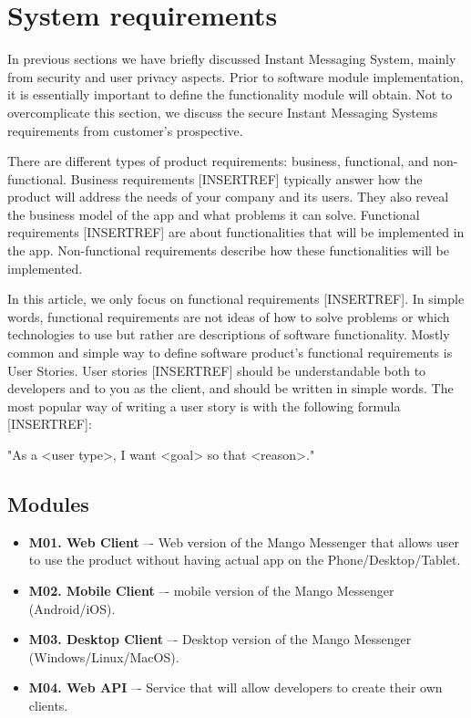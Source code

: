 \chapter{System requirements}\label{ch:system-requirements}

In previous sections we have briefly discussed Instant Messaging System, mainly from security and user privacy aspects.
Prior to software module implementation, it is essentially important to define the functionality module will obtain.
Not to overcomplicate this section, we discuss the secure Instant Messaging Systems requirements from customer's prospective.

There are different types of product requirements: business, functional, and non-functional.
Business requirements [INSERTREF] typically answer how the product will address the needs of your company and its users.
They also reveal the business model of the app and what problems it can solve.
Functional requirements [INSERTREF] are about functionalities that will be implemented in the app.
Non-functional requirements describe how these functionalities will be implemented.

In this article, we only focus on functional requirements [INSERTREF].
In simple words, functional requirements are not ideas of how to solve problems or which technologies to use but rather
are descriptions of software functionality.
Mostly common and simple way to define software product's functional requirements is User Stories.
User stories [INSERTREF] should be understandable both to developers and to you as the client, and should be written in simple words.
The most popular way of writing a user story is with the following formula [INSERTREF]:

\begin{center}
    "As a <user type>, I want <goal> so that <reason>."
\end{center}


\section{Modules}\label{sec:modules}
\begin{itemize}
    \item \textbf{M01. Web Client} –- Web version of the Mango Messenger that allows user to use the
    product without having actual app on the Phone/Desktop/Tablet.
    \item \textbf{M02. Mobile Client} –- mobile version of the Mango Messenger (Android/iOS).
    \item \textbf{M03. Desktop Client} –- Desktop version of the Mango Messenger (Windows/Linux/MacOS).
    \item \textbf{M04. Web API} –- Service that will allow developers to create their own clients.
\end{itemize}

